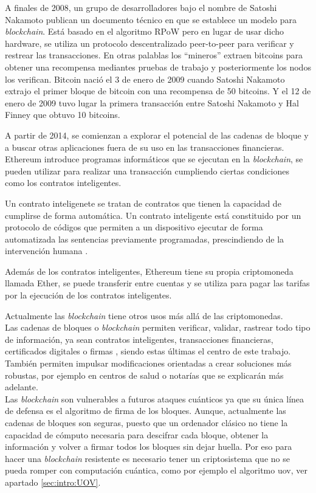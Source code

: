 A finales de 2008, un grupo de desarrolladores bajo el nombre de Satoshi Nakamoto publican un documento técnico en que se establece un modelo para \textit{blockchain}. Está basado en el algoritmo RPoW pero en lugar de usar dicho hardware, se utiliza un protocolo descentralizado peer-to-peer para verificar y restrear las transacciones. En otras palablas los ``mineros'' extraen bitcoins para obtener una recompensa mediantes pruebas de trabajo y posteriormente los nodos los verifican. Bitcoin nació el 3 de enero de 2009 cuando Satoshi Nakamoto extrajo el primer bloque de bitcoin con una recompensa de 50 bitcoins. Y el 12 de enero de 2009 tuvo lugar la primera transacción entre Satoshi Nakamoto y Hal Finney que obtuvo 10 bitcoins.

A partir de 2014, se comienzan a explorar el potencial de las cadenas de bloque y a buscar otras aplicaciones fuera de su uso en las transacciones financieras.
Ethereum introduce programas informáticos que se ejecutan en la \textit{blockchain}, se pueden utilizar para realizar una transacción cumpliendo ciertas condiciones como los contratos inteligentes.

Un contrato inteligenete se tratan de contratos que tienen la capacidad de cumplirse de forma automática. Un contrato inteligente está constituido por un protocolo de códigos que permiten a un dispositivo ejecutar de forma automatizada las sentencias previamente programadas, prescindiendo de la intervención humana \cite{contrato-inteligente}.

Además de los contratos inteligentes, Ethereum tiene su propia criptomoneda llamada Ether, se puede transferir entre cuentas y se utiliza para pagar las tarifas por la ejecución de los contratos inteligentes.

Actualmente las \textit{blockchain} tiene otros usos más allá de las criptomonedas.\\


Las cadenas de bloques o \textit{blockchain} permiten verificar, validar, rastrear todo tipo de información, ya sean contratos inteligentes, transacciones financieras, certificados digitales o firmas \cite{blockchain}, siendo estas últimas el centro de este trabajo. También permiten impulsar modificaciones orientadas a crear soluciones más robustas, por ejemplo en centros de salud o notarías que se explicarán más adelante.\\

Las \textit{blockchain} son vulnerables a futuros ataques cuánticos ya que su única línea de defensa es el algoritmo de firma de los bloques. Aunque, actualmente las cadenas de bloques son seguras, puesto que un ordenador clásico no tiene la capacidad de cómputo necesaria para descifrar cada bloque, obtener la información y volver a firmar todos los bloques sin dejar huella. Por eso para hacer una \textit{blockchain} resistente es necesario tener un criptosistema que no se pueda romper con computación cuántica, como por ejemplo el algoritmo \acrshort{uov}, ver apartado \ref{sec:intro:UOV}. \\

